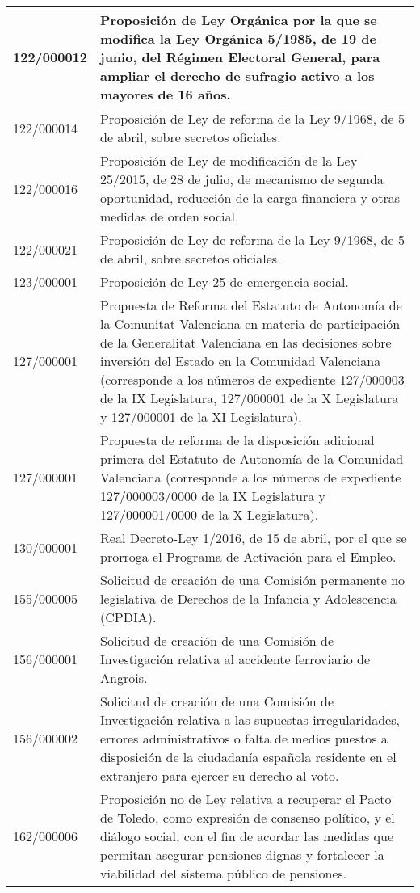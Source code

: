 {\begin{table}[H]
\begin{center}
\begin{tabularx}{\linewidth}{| l | X |}
\hline
122/000012 & Proposición de Ley Orgánica por la que se modifica la Ley Orgánica 5/1985, de 19 de junio, del Régimen Electoral General, para ampliar el derecho de sufragio activo a los mayores de 16 años. \\
\hline
122/000014 & Proposición de Ley de reforma de la Ley 9/1968, de 5 de abril, sobre secretos oficiales. \\
\hline
122/000016 & Proposición de Ley de modificación de la Ley 25/2015, de 28 de julio, de mecanismo de segunda oportunidad, reducción de la carga financiera y otras medidas de orden social. \\
\hline
122/000021 & Proposición de Ley de reforma de la Ley 9/1968, de 5 de abril, sobre secretos oficiales. \\
\hline
123/000001 & Proposición de Ley 25 de emergencia social. \\
\hline
127/000001 & Propuesta de Reforma del Estatuto de Autonomía de la Comunitat Valenciana en materia de participación de la Generalitat Valenciana en las decisiones sobre inversión del Estado en la Comunidad Valenciana (corresponde a los números de expediente 127/000003 de la IX Legislatura, 127/000001 de la X Legislatura y 127/000001 de la XI Legislatura). \\
\hline
127/000001 & Propuesta de reforma de la disposición adicional primera del Estatuto de Autonomía de la Comunidad Valenciana (corresponde a los números de expediente 127/000003/0000 de la IX Legislatura y 127/000001/0000 de la X Legislatura). \\
\hline
130/000001 & Real Decreto-Ley 1/2016, de 15 de abril, por el que se prorroga el Programa de Activación para el Empleo. \\
\hline
155/000005 & Solicitud de creación de una Comisión permanente no legislativa de Derechos de la Infancia y Adolescencia (CPDIA). \\
\hline
156/000001 & Solicitud de creación de una Comisión de Investigación relativa al accidente ferroviario de Angrois. \\
\hline
156/000002 & Solicitud de creación de una Comisión de Investigación relativa a las supuestas irregularidades, errores administrativos o falta de medios puestos a disposición de la ciudadanía española residente en el extranjero para ejercer su derecho al voto. \\
\hline
162/000006 & Proposición no de Ley relativa a recuperar el Pacto de Toledo, como expresión de consenso político, y el diálogo social, con el fin de acordar las medidas que permitan asegurar pensiones dignas y fortalecer la viabilidad del sistema público de pensiones. \\

\end{tabularx}
\end{center}
\end{table}}
